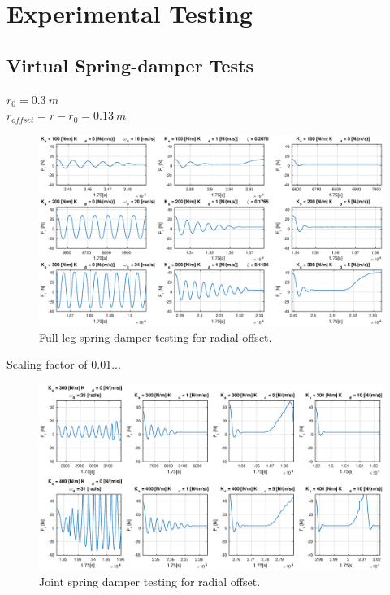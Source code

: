 \chapter{Experimental Testing}

\section{Virtual Spring-damper Tests} 
\label{sec:Virtual Spring-damper Tests}
$r_0 = 0.3\ m$\\
$r_{offset} = r - r_0 = 0.13\ m$

\begin{figure}
\centering
\includegraphics[width=1\textwidth]{images/experiments/spring-damper-tests2.eps} 
\caption{Full-leg spring damper testing for radial offset.}
\label{fig:spring-damper-tests}
\end{figure}

Scaling factor of 0.01...
\begin{figure}
\centering
\includegraphics[width=1\textwidth]{images/experiments/joint-spring-damper-tests.eps} 
\caption{Joint spring damper testing for radial offset.}
\label{fig:joint-spring-damper-tests}
\end{figure}

